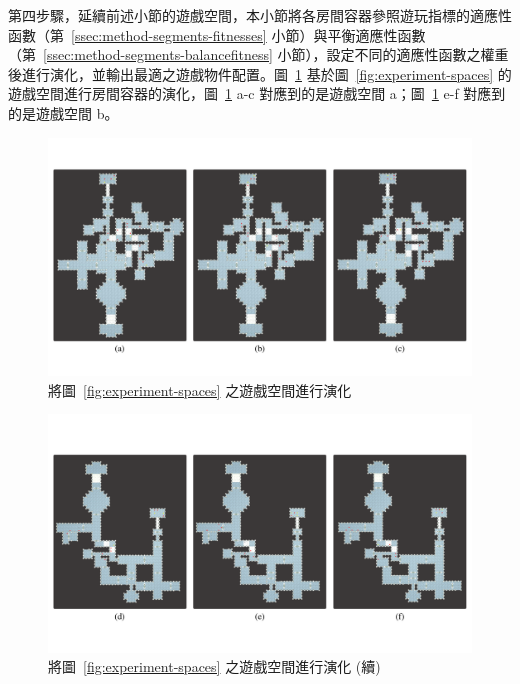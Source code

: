 第四步驟，延續前述小節的遊戲空間，本小節將各房間容器參照遊玩指標的適應性函數（第~\ref{ssec:method-segments-fitnesses} 小節）與平衡適應性函數（第~\ref{ssec:method-segments-balancefitness} 小節），設定不同的適應性函數之權重後進行演化，並輸出最適之遊戲物件配置。圖~\ref{fig:experiment-volumes-evolution} 基於圖~\ref{fig:experiment-spaces} 的遊戲空間進行房間容器的演化，圖~\ref{fig:experiment-volumes-evolution} a-c 對應到的是遊戲空間 a；圖~\ref{fig:experiment-volumes-evolution} e-f 對應到的是遊戲空間 b。

\begin{landscape}
  \begin{figure}[H]
    \begin{center}
      \includegraphics[width=1.05\linewidth]{figures/experiments/experiment-evolution-722780748.pdf}
      \caption{將圖~\protect\ref{fig:experiment-spaces} 之遊戲空間進行演化}
      \label{fig:experiment-volumes-evolution}
    \end{center}
  \end{figure}
\end{landscape}

\begin{landscape}
  \begin{figure}[H]
    \begin{center}
      \includegraphics[width=1.05\linewidth]{figures/experiments/experiment-evolution-1502202776.pdf}
      \caption{將圖~\protect\ref{fig:experiment-spaces} 之遊戲空間進行演化 (續)}
    \end{center}
  \end{figure}
\end{landscape}

